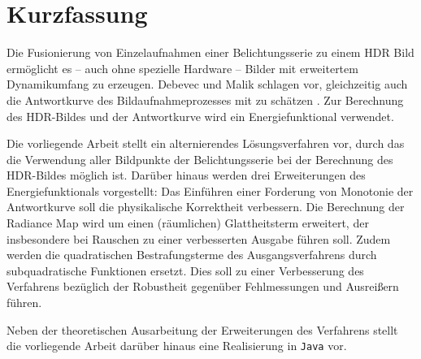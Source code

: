 \section*{Kurzfassung}
Die Fusionierung von Einzelaufnahmen einer Belichtungsserie zu einem \gls{HDR} Bild ermöglicht es -- auch ohne spezielle Hardware -- Bilder mit erweitertem \gls{Dynamikumfang} zu erzeugen. Debevec und Malik schlagen vor, gleichzeitig auch die Antwortkurve des Bildaufnahmeprozesses mit zu schätzen \cite{paper}. Zur Berechnung des \gls{HDR}-Bildes und der Antwortkurve wird ein Energiefunktional verwendet. 

Die vorliegende Arbeit stellt ein alternierendes Lösungsverfahren vor, durch das die Verwendung aller Bildpunkte der Belichtungsserie bei der Berechnung des \gls{HDR}-Bildes möglich ist. Darüber hinaus werden drei Erweiterungen des Energiefunktionals vorgestellt: Das Einführen einer Forderung von Monotonie der Antwortkurve soll die physikalische Korrektheit verbessern. Die Berechnung der \gls{Radiance Map} wird um einen (räumlichen) Glattheitsterm erweitert, der insbesondere bei Rauschen zu einer verbesserten Ausgabe führen soll. Zudem werden die quadratischen Bestrafungsterme des Ausgangsverfahrens durch subquadratische Funktionen ersetzt. Dies soll zu einer Verbesserung des Verfahrens bezüglich der Robustheit gegenüber Fehlmessungen und Ausreißern führen.

Neben der theoretischen Ausarbeitung der Erweiterungen des Verfahrens stellt die vorliegende Arbeit darüber hinaus eine Realisierung in \texttt{Java} vor.